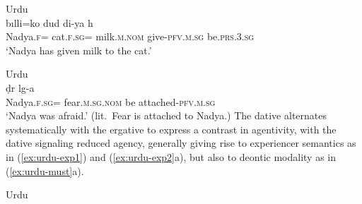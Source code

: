 \documentclass[output=paper,hidelinks]{langscibook}
\begin{document}
\ea \label{ex:urdu-goal}
Urdu\\
  {b{\i}lli=ko}  {dud} {di-ya} {h{\textepsilon}} \\
{Nadya.\textsc{f}=\ERG}  {cat.\textsc{f.sg}=\DAT} {milk.\textsc{m.nom}}  {give-\textsc{pfv.m.sg}} 
{be.\textsc{prs.3.sg}} \\
\glt `Nadya has given milk to the cat.'
\z

\ea \label{ex:urdu-exp1}
Urdu\\
 {\d{d}{\textscripta}r}  {l{\textscripta}g-a} \\
{Nadya.\textsc{f.sg}=\DAT} {fear.\textsc{m.sg.nom}} {be attached-\textsc{pfv.m.sg}}\\
\glt `Nadya was afraid.' (lit.~Fear is attached to Nadya.)
\z 
The dative alternates systematically with the ergative to express a contrast in
agentivity, with the dative signaling reduced agency, generally giving rise to
experiencer semantics as in (\ref{ex:urdu-exp1}) and (\ref{ex:urdu-exp2}a), but
also to deontic modality as in (\ref{ex:urdu-must}a).

\begin{exe}
  \ex \label{ex:urdu-exp2}
Urdu
  \begin{xlist}

    \end{xlist}
    \end{exe}
\end{document}
